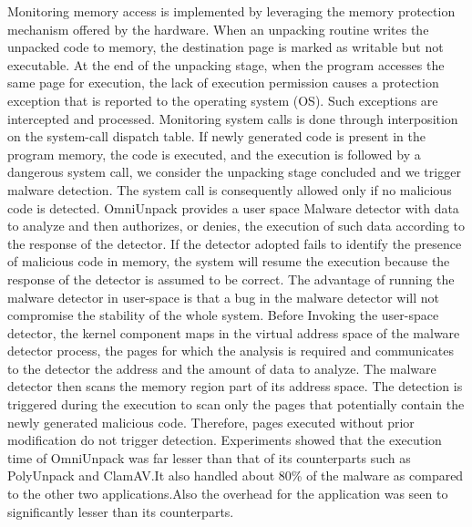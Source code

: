 \documentclass[11pt]{article}
\begin{document}
		Monitoring memory access is implemented by leveraging the memory protection mechanism offered by the hardware. When an unpacking routine writes the unpacked code to memory, the destination page is marked as writable but not executable. At the end of the unpacking stage, when the program accesses the same page for execution, the lack of execution permission causes a protection exception that is reported to the operating system (OS). Such exceptions are intercepted and processed.
		Monitoring system calls is done through interposition on the system-call dispatch table. If newly generated code is present in the program memory, the code is executed, and the execution is followed by a dangerous system call, we consider the unpacking stage concluded and we trigger malware detection. The system call is consequently allowed only if no malicious code is detected.
		OmniUnpack provides a user space Malware detector with data to analyze and then authorizes, or denies, the execution of such data according to the response of the detector. If the detector adopted fails to identify the presence of malicious code in memory, the system will resume the execution because the response of the detector is assumed to be correct. The advantage of running the malware detector in user-space is that a bug in the malware detector will not compromise the stability of the whole system. Before Invoking the user-space detector, the kernel component maps in the virtual address space of the malware detector process, the pages for which the analysis is required and communicates to the detector the address and the amount of data to analyze. The malware detector then scans the memory region part of its address space. The detection is triggered during the execution to scan only the pages that potentially contain the newly generated malicious code. Therefore, pages executed without prior modification do not trigger detection.
		Experiments showed that the execution time of OmniUnpack was far lesser than that of its counterparts such as PolyUnpack and ClamAV.It also handled about 80\% of the malware as compared to the other two applications.Also the overhead for the application was seen to significantly lesser than its counterparts.
		
\end{document}
